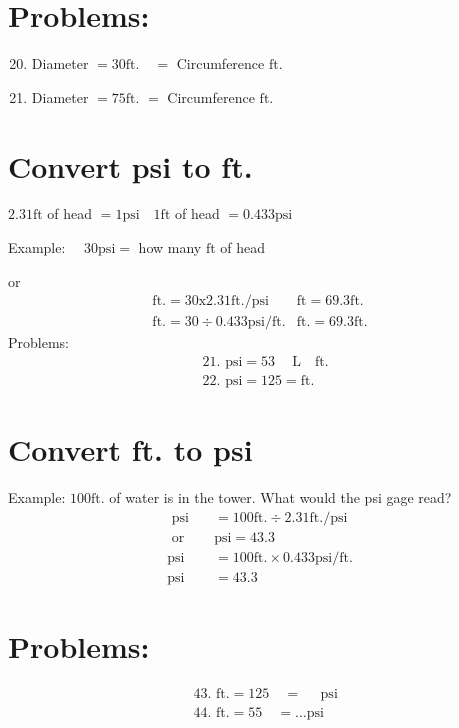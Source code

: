 \begin{enumerate}
\section{Problems:}
\begin{enumerate}
  \setcounter{enumi}{19}
  \item Diameter $=30 \mathrm{ft} . \quad=$ Circumference $\mathrm{ft}$.

  \item Diameter $=75 \mathrm{ft}$. $=$ Circumference $\mathrm{ft}$.

\end{enumerate}
\section{Convert psi to ft.}
$2.31 \mathrm{ft}$ of head $=1 \mathrm{psi} \quad 1 \mathrm{ft}$ of head $=0.433 \mathrm{psi}$

Example: $\quad 30 \mathrm{psi}=$ how many $\mathrm{ft}$ of head

or
$$
\begin{array}{ll}
\mathrm{ft} .=30 \mathrm{x} 2.31 \mathrm{ft} . / \mathrm{psi} & \mathrm{ft}=69.3 \mathrm{ft} . \\
\mathrm{ft} .=30 \div 0.433 \mathrm{psi} / \mathrm{ft} . & \mathrm{ft} .=69.3 \mathrm{ft} .
\end{array}
$$
Problems:
$$
\begin{aligned}
& \text { 21. } \mathrm{psi}=53 \quad \mathrm{~L} \quad \mathrm{ft} \text {. } \\
& \text { 22. } \mathrm{psi}=125=\mathrm{ft} \text {. }
\end{aligned}
$$

\section{Convert ft. to psi}
Example: $100 \mathrm{ft}$. of water is in the tower. What would the psi gage read?
$$
\begin{array}{ll}
\text { psi } & =100 \mathrm{ft} . \div 2.31 \mathrm{ft} . / \mathrm{psi} \\
\text { or } \quad & \mathrm{psi}=43.3 \\
\mathrm{psi} & =100 \mathrm{ft} . \times 0.433 \mathrm{psi} / \mathrm{ft} . \\
\mathrm{psi} & =43.3
\end{array}
$$

\section{Problems:}
$$
\begin{aligned}
& \text { 43. } \mathrm{ft} .=125 \quad=\quad \text { psi } \\
& \text { 44. } \mathrm{ft} .=55 \quad=\ldots \mathrm{psi}
\end{aligned}
$$


\end{enumerate}
